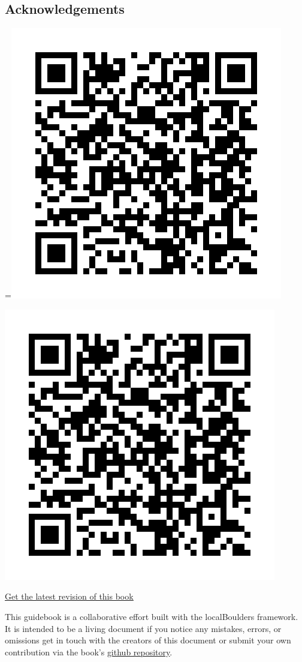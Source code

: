 \raggedcolumns
\begin{multicols}{2}

\section{Acknowledgements}
=\hbox{\includegraphics[width=0.45\linewidth]{./maps/qr/The Garden_qr.png}}%
\begin{center}
\includegraphics[width=0.45\linewidth]{./maps/qr/The Garden_qr.png}
\end{center}
\begin{center}
\underline{\textcolor{blue}{\href{https://github.com/AndrewChild/The-Garden-Guidebook/raw/main/guideBook.pdf}{Get the latest revision of this book}}}
\end{center}

This guidebook is a collaborative effort built with the localBoulders framework. It is intended to be a living document if you notice any mistakes, errors, or omissions get in touch with the creators of this document or submit your own contribution via the book's \underline{\textcolor{blue}{\href{https://github.com/AndrewChild/The-Garden-Guidebook}{github repository}}}.
\end{multicols}
\clearpage